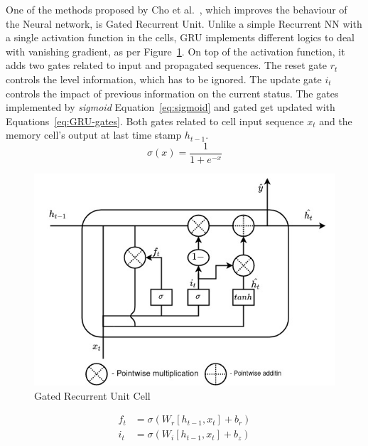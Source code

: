 One of the methods proposed by Cho et al.~\cite{GRU_cho_properties_2014}, which improves the behaviour of the Neural network, is Gated Recurrent Unit.
Unlike a simple Recurrent NN with a single activation function in the cells, GRU implements different logics to deal with vanishing gradient, as per Figure~\ref{fig:GRU-cell}.
On top of the activation function, it adds two gates related to input and propagated sequences.
The reset gate $r_t$ controls the level information, which has to be ignored.
The update gate $i_t$ controls the impact of previous information on the current status.
The gates implemented by \textit{sigmoid} Equation~\ref{eq:sigmoid} and gated get updated with Equations~\ref{eq:GRU-gates}.
Both gates related to cell input sequence $x_t$ and the memory cell's output at last time stamp $h_{t-1}$.
\begin{equation}
    \sigma(x) = \frac{1}{1+e^{-x}}
    \label{eq:sigmoid}
\end{equation}
\begin{figure}[ht]%
    \centering
    \includegraphics[width=0.7\linewidth]{II_Body/GRU/images/GRU.jpg}
    \caption{Gated Recurrent Unit Cell}
    \label{fig:GRU-cell}
\end{figure}
\begin{equation}
    \begin{split}
        f_t &= \sigma \left (W_{r} \left [h_{t-1}, x_t \right ] + b_r \right ) \\
        i_t &= \sigma \left (W_{i} \left [h_{t-1}, x_t \right ] + b_z \right )
    \end{split}
    \label{eq:GRU-gates}
\end{equation}
